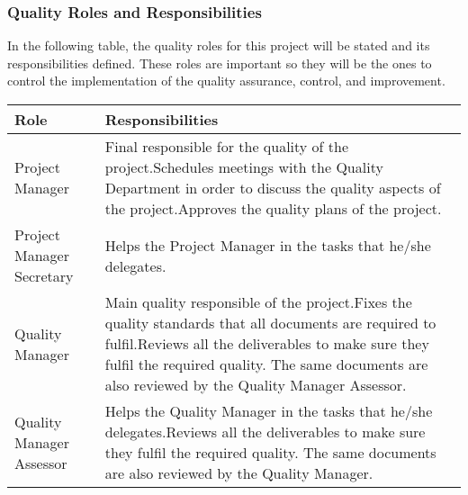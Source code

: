 \subsubsection{Quality Roles and Responsibilities}
In the following table, the quality roles for this project will be stated and its responsibilities defined. These roles are important so they will be the ones to control the implementation of the quality assurance, control, and improvement.

\begin{longtable}[H]{>{\raggedright\arraybackslash}p{5cm} p{9cm}}
	
	\toprule[2pt]
	
	\textbf{Role} &  \textbf{Responsibilities}\\
	
	\midrule [1.5pt]
	\endhead
	
	Project Manager & Final responsible for the quality of the project.\vspace{0.3cm}\newline Schedules meetings with the Quality Department in order to discuss the quality aspects of the project.\vspace{0.3cm}\newline Approves the quality plans of the project.\vspace{0.2cm} \\
	
	\midrule
		
	Project Manager Secretary & Helps the Project Manager in the tasks that he/she delegates.\vspace{0.2cm} \\
	
	\midrule
	
	Quality Manager & Main quality responsible of the project.\vspace{0.3cm}\newline Fixes the quality standards that all documents are required to fulfil.\vspace{0.3cm}\newline Reviews all the deliverables to make sure they fulfil the required quality. The same documents are also reviewed by the Quality Manager Assessor.\vspace{0.2cm} \\

	\midrule
	
	Quality Manager Assessor & Helps the Quality Manager in the tasks that he/she delegates.\vspace{0.3cm}\newline Reviews all the deliverables to make sure they fulfil the required quality. The same documents are also reviewed by the Quality Manager.\vspace{0.2cm} \\
	

\end{longtable}
